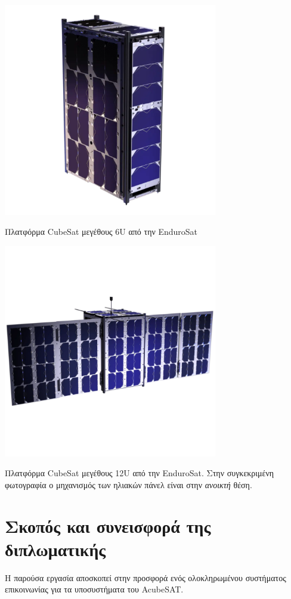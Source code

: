 \documentclass[a4paper,nobib,justified]{tufte-book}
\begin{document}
\begin{marginfigure}
	\includegraphics[width=0.7\textwidth]{media/images/endurosat-platforms/6u.png}
	\caption{Πλατφόρμα CubeSat μεγέθους 6U από την EnduroSat }

	\includegraphics[width=0.7\textwidth]{media/images/endurosat-platforms/12u.png}
	\caption{Πλατφόρμα CubeSat μεγέθους 12U από την EnduroSat. Στην συγκεκριμένη φωτογραφία ο μηχανισμός των ηλιακών πάνελ είναι στην \emph{ανοικτή} θέση. }
\end{marginfigure}

\section{Σκοπός και συνεισφορά της διπλωματικής}
Η παρούσα εργασία αποσκοπεί στην προσφορά ενός ολοκληρωμένου συστήματος επικοινωνίας για τα υποσυστήματα του AcubeSAT.
\end{document}
